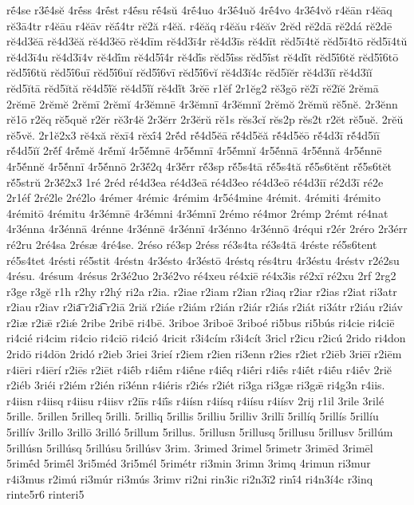 {rḗ4se
r3ḗ4sĕ
4rḗss
4rḗst
r4ḗsu
rḗ4sŭ
4rḗ4uo
4r3ḗ4uŏ
4rḗ4vo
4r3ḗ4vŏ
r4ĕān
r4ĕāq
rĕ3ā4tr
r4ĕāu
r4ĕāv
rĕā́4tr
rĕ2ă
r4ĕă.
r4ĕăq
r4ĕău
r4ĕăv
2rĕd
rĕ2dā
rĕ2dá
rĕ2dē
rĕ4d3ĕā
rĕ4d3ĕă
rĕ4d3ĕō
rĕ4dīm
rĕ4d3ī4r
rĕ4d3īs
rĕ4dīt
rĕd5ī4tĕ
rĕd5ī4tō
rĕd5ī4tŭ
rĕ4d3ī4u
rĕ4d3ī4v
rĕ4dī́m
rĕ4d5ī́4r
rĕ4dī́s
rĕd5ī́ss
rĕd5ī́st
rĕ4dī́t
rĕd5ī́6tĕ
rĕd5ī́6tō
rĕd5ī́6tŭ
rĕd5ī́6uī
rĕd5ī́6uĭ
rĕd5ī́6vī
rĕd5ī́6vĭ
rĕ4d3ĭ4c
rĕd5ĭĕr
rĕ4d3ĭī
rĕ4d3ĭĭ
rĕd5ĭtā
rĕd5ĭtă
rĕ4d5ĭ́ĕ
rĕ4d5ĭ́ĭ
rĕ4dĭ́t
3rĕē
r1ĕf
2r1ĕg2
rĕ3gō
rĕ2ī
rĕ2ĭĕ
2rĕmā
2rĕmē
2rĕmĕ
2rĕmī
2rĕmĭ
4r3ĕmnē
4r3ĕmnī
4r3ĕmnĭ
2rĕmŏ
2rĕmŭ
rĕ5nĕ.
2r3ĕnn
rĕ1ō
r2ĕq
rĕ5quĕ
r2ĕr
rĕ3r4ĕ
2r3ĕrr
2r3ĕrŭ
rĕ1s
rĕs3cĭ
rĕs2p
rĕs2t
r2ĕt
rĕ5uĕ.
2rĕŭ
rĕ5vĕ.
2r1ĕ2x3
rĕ4xă
rĕxī4
rĕxī́4
2rĕ́d
rĕ́4d5ĕā
rĕ́4d5ĕă
rĕ́4d5ĕō
rĕ́4d3ī
rĕ́4d5ĭī
rĕ́4d5ĭĭ
2rĕ́f
4rĕ́mĕ
4rĕ́mĭ
4r5ĕ́mnē
4r5ĕ́mnī
4r5ĕ́mnĭ
4r5ĕ́nnā
4r5ĕ́nnă
4r5ĕ́nnē
4r5ĕ́nnĕ
4r5ĕ́nnī
4r5ĕ́nnō
2r3ĕ́2q
4r3ĕ́rr
rĕ́3sp
rĕ́5s4tā
rĕ́5s4tă
rĕ́5s6tĕnt
rĕ́5s6tĕt
rĕ́5strŭ
2r3ĕ́2x3
1ré
2réd
ré4d3ea
ré4d3eā
ré4d3eo
ré4d3eō
ré4d3iī
ré2d3ī
ré2e
2r1éf
2ré2le
2ré2lo
4rémer
4rémic
4rémim
4r5é4mine
4rémit.
4rémiti
4rémito
4rémitō
4rémitu
4r3émnē
4r3émni
4r3émnī
2rémo
ré4mor
2rémp
2rémt
ré4nat
4r3énna
4r3énnā
4rénne
4r3énnē
4r3énnī
4r3énno
4r3énnō
4réqui
r2ér
2réro
2r3érr
ré2ru
2ré4sa
2résæ
4ré4se.
2réso
ré3sp
2réss
ré3s4ta
ré3s4tā
4réste
ré5s6tent
ré5s4tet
4résti
ré5stit
4réstn
4r3ésto
4r3éstō
4réstq
rés4tru
4r3éstu
4réstv
r2é2su
4résu.
4résum
4résus
2r3é2uo
2r3é2vo
ré4xeu
ré4xiē
ré4x3is
ré2xī
ré2xu
2rf
2rg2
r3ge
r3gĕ
r1h
r2hy
r2hý
ri2a
r2ia.
r2iae
r2iam
r2ian
r2iaq
r2iar
r2ias
r2iat
ri3atr
r2iau
r2iav
r2ia͞
r2ia͡
r2iā
2riă
r2iáe
r2iám
r2ián
r2iár
r2iás
r2iát
ri3átr
r2iáu
r2iáv
r2iæ
r2iǣ
r2iǽ
2ribe
2ribē
ri4bē.
3riboe
3riboē
3riboé
ri5bus
ri5bús
ri4cie
ri4ciē
ri4cié
ri4cim
ri4cio
ri4ciō
ri4ció
4ricit
r3i4cím
r3i4cít
3ricl
r2icu
r2icú
2rido
ri4don
2ridō
ri4dōn
2ridó
r2ieb
3riei
3rieí
r2iem
r2ien
ri3enn
r2ies
r2iet
r2iēb
3riēī
r2iēm
r4iēri
r4iērí
r2iēs
r2iēt
r4iḗb
r4iḗm
r4iḗne
r4iḗq
r4iḗri
r4iḗs
r4iḗt
r4iḗu
r4iḗv
2riĕ
r2iéb
3riéi
r2iém
r2ién
ri3énn
r4iéris
r2iés
r2iét
ri3ga
ri3gæ
ri3gǣ
ri4g3n
r4iis.
r4iisn
r4iisq
r4iisu
r4iisv
r2iīs
r4iī́s
r4iísn
r4iísq
r4iísu
r4iísv
2rij
r1il
3rile
3rilé
5rille.
5rillen
5rilleq
5rilli.
5rilliq
5rillis
5rilliu
5rilliv
3rillī
5rillíq
5rillís
5rillíu
5rillív
3rillo
3rillō
3rilló
5rillum
5rillus.
5rillusn
5rillusq
5rillusu
5rillusv
5rillúm
5rillúsn
5rillúsq
5rillúsu
5rillúsv
3rim.
3rimed
3rimel
5rimetr
3rimēd
3rimēl
5rimḗd
5rimḗl
3ri5méd
3ri5mél
5rimétr
ri3min
3rimn
3rimq
4rimun
ri3mur
r4i3mus
r2imú
ri3múr
ri3mús
3rimv
ri2ni
rin3ic
ri2n3ī2
rinī́4
ri4n3í4c
r3inq
rinte5r6
rinteri5
}
